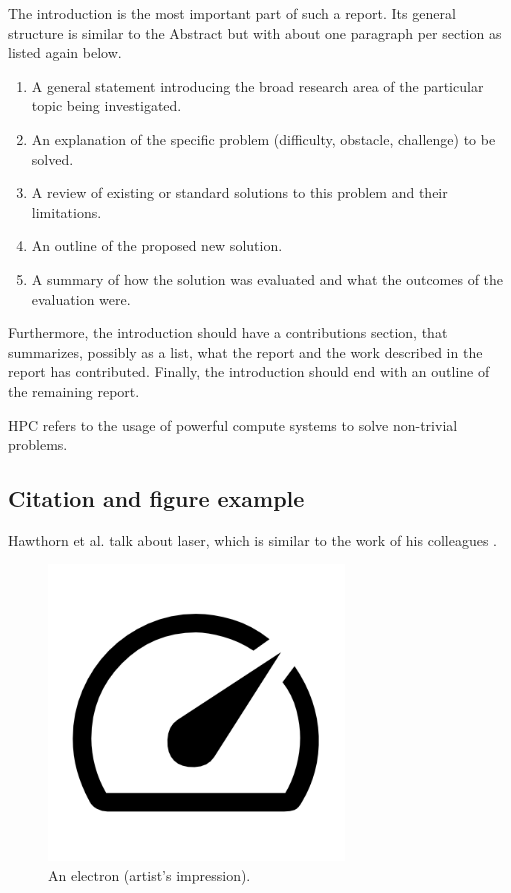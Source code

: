 \documentclass[12pt, a4paper, hidelinks]{article}
\begin{document}
\iffalse
The introduction is the most important part of such a report. Its general structure is similar to the Abstract but with about one paragraph per section as listed again below.
\begin{enumerate}
\item  A general statement introducing the broad research area of the particular topic being investigated.
\item  An explanation of the specific problem (difficulty, obstacle, challenge) to be solved.
\item  A review of existing or standard solutions to this problem and their limitations.
\item  An outline of the proposed new solution.
\item  A summary of how the solution was evaluated and what the outcomes of the evaluation were.
\end{enumerate}
Furthermore, the introduction should have a contributions section, that summarizes, possibly as a list, what the report and the work described in the report has contributed.
Finally, the introduction should end with an outline of the remaining report.

\ac{HPC} refers to the usage of powerful compute systems to solve non-trivial problems.

\subsection{Citation and figure example}
Hawthorn et al. \cite{20220610_dodge_measuring-the-carbon-intensity-of-ai-in-cloud-instances} talk about laser, which is similar to the work of his colleagues \cite{20220610_dodge_measuring-the-carbon-intensity-of-ai-in-cloud-instances, 20220610_dodge_measuring-the-carbon-intensity-of-ai-in-cloud-instances}.
\begin{figure}[th]
\centering
\includegraphics[width=0.7\textwidth]{speed_FILL0_wght400_GRAD0_opsz48.png}
\caption[An Electron]{An electron (artist's impression).}
\label{fig:Electron}
\end{figure}
\end{document}

